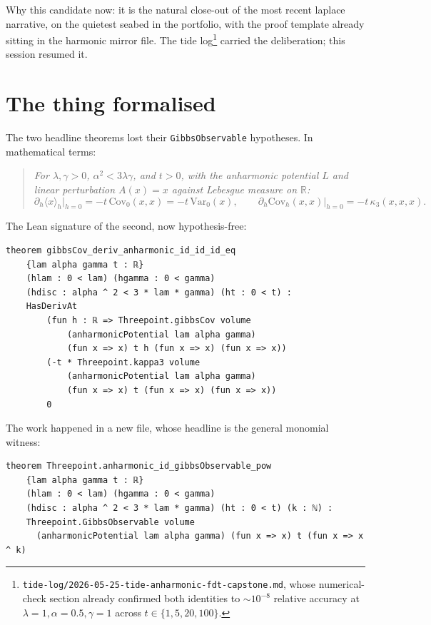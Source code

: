\documentclass[11pt]{article}
\begin{document}
Why this candidate now: it is the natural close-out of the most recent
laplace narrative, on the quietest seabed in the portfolio, with the
proof template already sitting in the harmonic mirror file. The tide
log\footnote{\texttt{tide-log/2026-05-25-tide-anharmonic-fdt-capstone.md},
whose numerical-check section already confirmed both identities to
$\sim$$10^{-8}$ relative accuracy at $\lambda{=}1,\alpha{=}0.5,\gamma{=}1$
across $t\in\{1,5,20,100\}$.} carried the deliberation; this session
resumed it.

\section{The thing formalised}

The two headline theorems lost their \texttt{GibbsObservable}
hypotheses. In mathematical terms:

\begin{quote}\itshape
For $\lambda,\gamma>0$, $\alpha^2 < 3\lambda\gamma$, and $t>0$, with the
anharmonic potential $L$ and linear perturbation $A(x)=x$ against
Lebesgue measure on $\mathbb{R}$:
\[
  \partial_h\langle x\rangle_h\big|_{h=0} = -t\,\mathrm{Cov}_0(x,x)
    = -t\,\mathrm{Var}_0(x),
  \qquad
  \partial_h\mathrm{Cov}_h(x,x)\big|_{h=0} = -t\,\kappa_3(x,x,x).
\]
\end{quote}

The Lean signature of the second, now hypothesis-free:

\begin{verbatim}
theorem gibbsCov_deriv_anharmonic_id_id_id_eq
    {lam alpha gamma t : ℝ}
    (hlam : 0 < lam) (hgamma : 0 < gamma)
    (hdisc : alpha ^ 2 < 3 * lam * gamma) (ht : 0 < t) :
    HasDerivAt
        (fun h : ℝ => Threepoint.gibbsCov volume
            (anharmonicPotential lam alpha gamma)
            (fun x => x) t h (fun x => x) (fun x => x))
        (-t * Threepoint.kappa3 volume
            (anharmonicPotential lam alpha gamma)
            (fun x => x) t (fun x => x) (fun x => x))
        0
\end{verbatim}

The work happened in a new file, whose headline is the general monomial
witness:

\begin{verbatim}
theorem Threepoint.anharmonic_id_gibbsObservable_pow
    {lam alpha gamma t : ℝ}
    (hlam : 0 < lam) (hgamma : 0 < gamma)
    (hdisc : alpha ^ 2 < 3 * lam * gamma) (ht : 0 < t) (k : ℕ) :
    Threepoint.GibbsObservable volume
      (anharmonicPotential lam alpha gamma) (fun x => x) t (fun x => x ^ k)
\end{verbatim}
\end{document}
